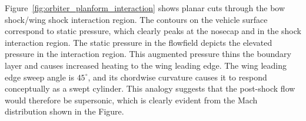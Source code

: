 Figure~\ref{fig:orbiter_planform_interaction} shows planar cuts through the bow shock/wing shock interaction region.  The contours on the vehicle surface correspond to static pressure, which clearly peaks at the nosecap and in the shock interaction region. The static pressure in the flowfield depicts the elevated pressure in the interaction region.  This augmented pressure thins the boundary layer and causes increased heating to the wing leading edge.  The wing leading edge sweep angle is $45^\circ$, and its chordwise curvature causes it to respond conceptually as a swept cylinder.  This analogy suggests that the post-shock flow would therefore be supersonic, which is clearly evident from the Mach distribution shown in the Figure.
\begin{figure}[hbtp]
  \begin{center}
     \\
     \\

\end{center}
\end{figure}
